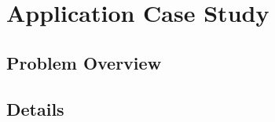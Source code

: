 \section{Application Case Study}
\label{casestudy}

\subsection{Problem Overview}
 

\subsection{Details}

 